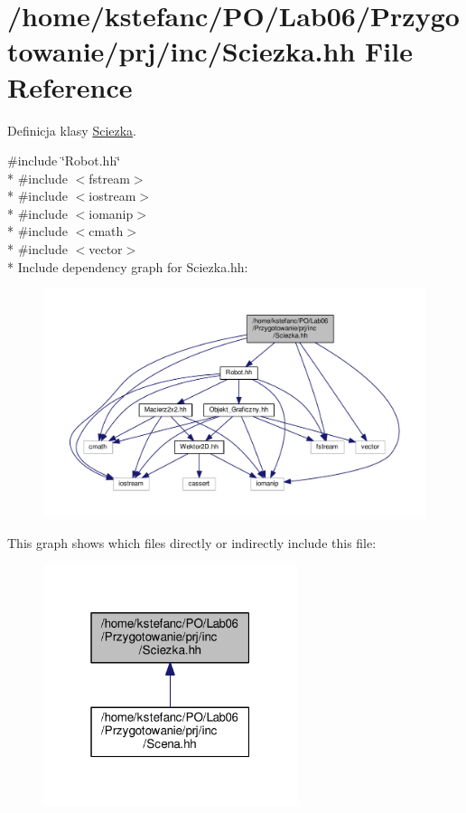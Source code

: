 \hypertarget{_sciezka_8hh}{\section{/home/kstefanc/\+P\+O/\+Lab06/\+Przygotowanie/prj/inc/\+Sciezka.hh File Reference}
\label{_sciezka_8hh}
}


Definicja klasy \hyperlink{class_sciezka}{Sciezka}.  


{\ttfamily \#include \char`\"{}Robot.\+hh\char`\"{}}\\*
{\ttfamily \#include $<$fstream$>$}\\*
{\ttfamily \#include $<$iostream$>$}\\*
{\ttfamily \#include $<$iomanip$>$}\\*
{\ttfamily \#include $<$cmath$>$}\\*
{\ttfamily \#include $<$vector$>$}\\*
Include dependency graph for Sciezka.\+hh\+:
\nopagebreak
\begin{figure}[H]
\begin{center}
\leavevmode
\includegraphics[width=350pt]{_sciezka_8hh__incl}
\end{center}
\end{figure}
This graph shows which files directly or indirectly include this file\+:
\nopagebreak
\begin{figure}[H]
\begin{center}
\leavevmode
\includegraphics[width=211pt]{_sciezka_8hh__dep__incl}
\end{center}
\end{figure}
